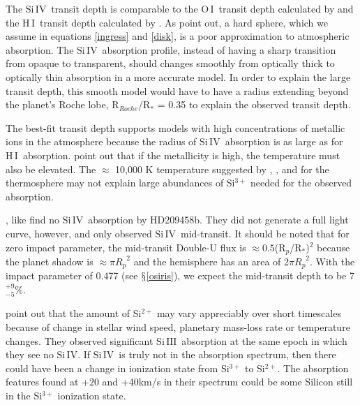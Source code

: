 \documentclass[manuscript]{aastex}
\newcommand{\oi}{\ensuremath{\mathrm{O}\,\scriptstyle \mathrm{I}}}
\newcommand{\hi}{\ensuremath{\mathrm{H}\,\scriptstyle \mathrm{I}}}
\newcommand{\siIV}{\ensuremath{\mathrm{Si}\,\scriptstyle \mathrm{IV}}}
\newcommand{\siIII}{\ensuremath{\mathrm{Si}\,\scriptstyle \mathrm{III}}}
\newcommand{\p}{R$_p$/R$_*$}
\newcommand{\lya}{Lyman-$\alpha$}
\begin{document}
The \siIV\ transit depth is comparable to the \oi\ transit depth calculated by \citet{vidmad} and the \hi\ transit depth calculated by \citet{benjaf7}. As \citet{kosk} point out, a hard sphere, which we assume in equations \ref{ingress} and \ref{disk}, is a poor approximation to atmospheric absorption. The \siIV\ absorption profile, instead of having a sharp transition from opaque to transparent, should changes smoothly from optically thick to optically thin absorption in a more accurate model. In order to explain the large transit depth, this smooth model would have to have a radius extending beyond the planet's Roche lobe, R$_{Roche}$/R$_*$ = 0.35 \citep{ben10} to explain the observed transit depth.

The best-fit transit depth supports models with high concentrations of metallic ions in the atmosphere because the radius of \siIV\ absorption is as large as for \hi\ absorption. \citet{kosk} point out that if the metallicity is high, the temperature must also be elevated. The $\approx$ 10,000 K temperature suggested by \citet{gmunoz}, \citet{mclay}, and \citet{kosk} for the thermosphere may not explain large abundances of Si$^{3+}$ needed for the observed absorption. 


\citet{linsky}, like \citet{vidmad} find no \siIV\ absorption by HD209458b. They did not generate a full light curve, however, and only observed \siIV\ mid-transit. It should be noted that for zero impact parameter, the mid-transit Double-U flux is $\approx 0.5 $(\p)$^2$ because the planet shadow is $\approx \pi {R_p}^2$ and the hemisphere has an area of 2$\pi {R_p}^2$. With the impact parameter of 0.477 (see $\mathsection$\ref{osiris}), we expect the mid-transit depth to be  7$^{+9}_{-5}$\%. 

\citet{linsky} point out that the amount of Si$^{2+}$ may vary appreciably over short timescales because of change in stellar wind speed, planetary mass-loss rate or temperature changes. They observed significant \siIII\ absorption at the same epoch in which they see no \siIV. If \siIV\ is truly not in the absorption spectrum, then there could have been a change in ionization state from Si$^{3+}$ to Si$^{2+}$. The absorption features found at +20 and +40km/s in their spectrum could be some Silicon still in the Si$^{3+}$ ionization state.
\end{document}
